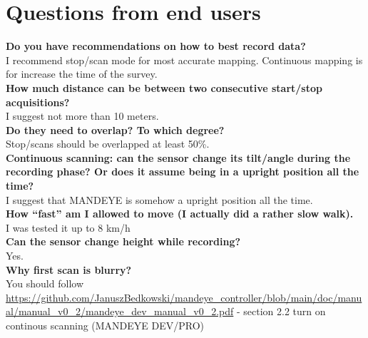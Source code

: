 \chapter{Questions from end users}

\textbf{Do you have recommendations on how to best record data?} \\
I recommend stop/scan mode for most accurate mapping.
Continuous mapping is for increase the time of the survey.  \\
\textbf{How much distance can be between two consecutive start/stop acquisitions?}\\
I suggest not more than 10 meters.\\
\textbf{Do they need to overlap? To which degree?}\\
Stop/scans should be overlapped at least 50\%.\\
\textbf{Continuous scanning: can the sensor change its tilt/angle during the recording phase? 
Or does it assume being in a upright position all the time?} \\
I suggest that MANDEYE  is somehow a upright position all the time. \\
\textbf{How “fast” am I allowed to move (I actually did a rather slow walk).} \\
I was tested it up to 8 km/h\\
\textbf{Can the sensor change height while recording?}\\
Yes.\\
\textbf{Why first scan is blurry?}\\
You should follow \url{https://github.com/JanuszBedkowski/mandeye_controller/blob/main/doc/manual/manual_v0_2/mandeye_dev_manual_v0_2.pdf} - section 2.2 turn on continous scanning (MANDEYE DEV/PRO)
